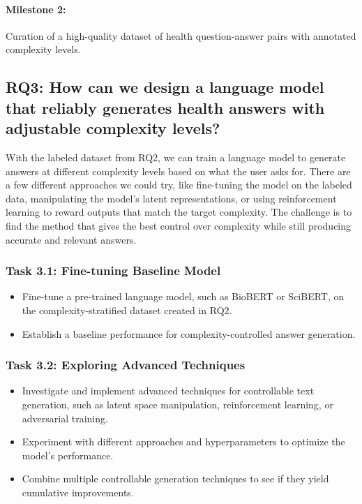 \paragraph{Milestone 2:} Curation of a high-quality dataset of health question-answer pairs with annotated complexity levels.


\subsection*{RQ3: How can we design a language model that reliably generates health answers with adjustable complexity levels?}

With the labeled dataset from RQ2, we can train a language model to generate answers at different complexity levels based on what the user asks for. 
There are a few different approaches we could try, like fine-tuning the model on the labeled data, manipulating the model's latent representations, or using reinforcement learning to reward outputs that match the target complexity. 
The challenge is to find the method that gives the best control over complexity while still producing accurate and relevant answers.

\subsubsection*{Task 3.1: Fine-tuning Baseline Model}

\begin{itemize}
    \item Fine-tune a pre-trained language model, such as BioBERT or SciBERT, on the complexity-stratified dataset created in RQ2.
    \item Establish a baseline performance for complexity-controlled answer generation.
\end{itemize}

\subsubsection*{Task 3.2: Exploring Advanced Techniques}

\begin{itemize}
    \item Investigate and implement advanced techniques for controllable text generation, such as latent space manipulation, reinforcement learning, or adversarial training.
    \item Experiment with different approaches and hyperparameters to optimize the model's performance.
    \item Combine multiple controllable generation techniques to see if they yield cumulative improvements.
\end{itemize}

